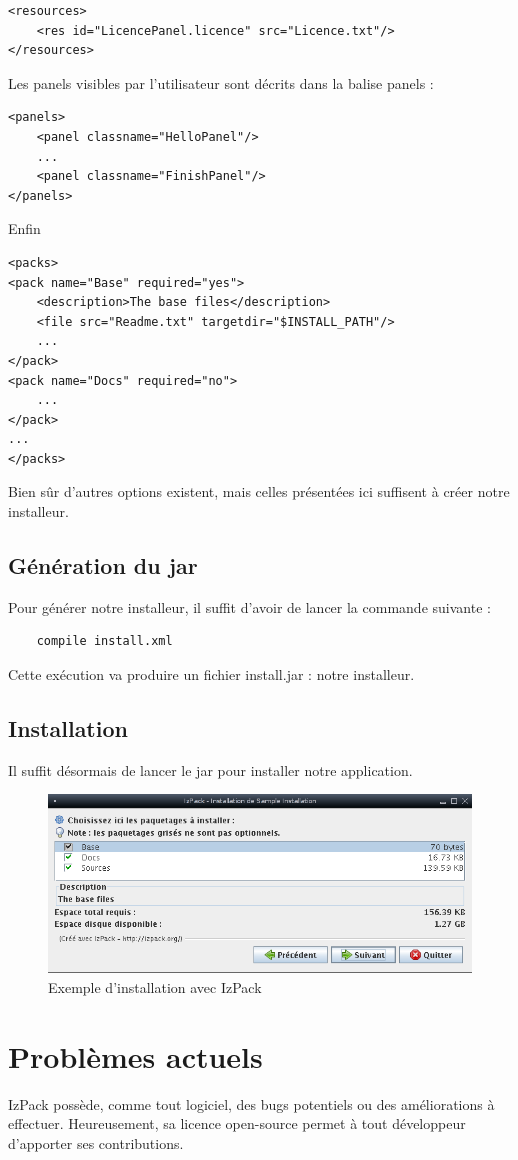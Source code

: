 \begin{lstlisting}
<resources>
	<res id="LicencePanel.licence" src="Licence.txt"/>
</resources>
\end{lstlisting}
Les panels visibles par l'utilisateur sont décrits dans la balise panels :
\begin{lstlisting}
<panels>
	<panel classname="HelloPanel"/>
	...
	<panel classname="FinishPanel"/>
</panels>
\end{lstlisting}
Enfin 
\begin{lstlisting}
<packs>
<pack name="Base" required="yes">
	<description>The base files</description>
	<file src="Readme.txt" targetdir="$INSTALL_PATH"/>
	...
</pack>
<pack name="Docs" required="no">
	...
</pack>
...
</packs>
\end{lstlisting}
Bien sûr d'autres options existent, mais celles présentées ici suffisent à créer notre installeur.
\subsection{Génération du jar}
Pour générer notre installeur, il suffit d'avoir de lancer la commande suivante :
\begin{verbatim}
	compile install.xml
\end{verbatim}
Cette exécution va produire un fichier install.jar : notre installeur.
\subsection{Installation}
Il suffit désormais de lancer le jar pour installer notre application.
\begin{figure}[H]
	\centering
	\includegraphics[width=15cm]{../image/installSample.png}
	\caption{Exemple d'installation avec IzPack}
\end{figure}

\section{Problèmes actuels}
IzPack possède, comme tout logiciel, des bugs potentiels ou des améliorations à effectuer.
Heureusement, sa licence open-source permet à tout développeur d'apporter ses contributions.

